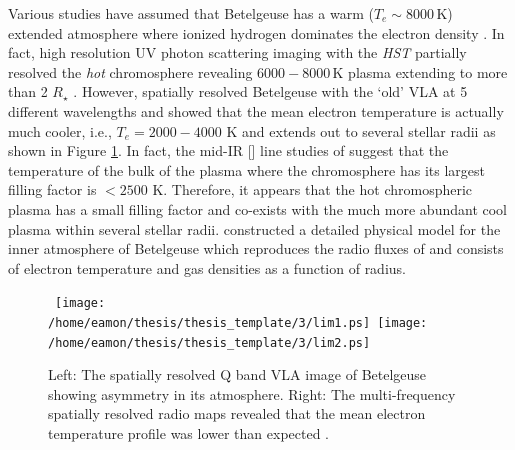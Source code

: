 Various studies have assumed that Betelgeuse has a warm ($T_e \sim 8000$\,K) extended atmosphere where ionized hydrogen dominates the electron density \citep[e.g.,][]{newell_1982,hartmann_1984}. In fact, high resolution UV photon scattering imaging with the \textit{HST} partially resolved the \textit{hot} chromosphere revealing $6000-8000$\,K plasma extending to more than 2 $R_{\star}$ \citep{gilliland_1996}. However, \cite{lim_1998} spatially resolved Betelgeuse with the `old' VLA at 5 different wavelengths and showed that the mean electron temperature is actually much cooler, i.e., $T_e = 2000 - 4000$ K and extends out to several stellar radii as shown in Figure \ref{fig3.1}. In fact, the mid-IR [] line studies of \cite{harper_2009} suggest that the temperature of the bulk of the plasma where the chromosphere has its largest filling factor is $< 2500$ K. Therefore, it appears that the hot chromospheric plasma has a small filling factor and co-exists with the much more abundant cool plasma within several stellar radii. \cite{harper_2001} constructed a detailed physical model for the inner atmosphere of Betelgeuse which reproduces the radio fluxes of \cite{lim_1998} and consists of electron temperature and gas densities as a function of radius.

\begin{figure}[hbt!]
\centering 
\mbox{
          \texttt{[image: /home/eamon/thesis/thesis\_template/3/lim1.ps]}
          \texttt{[image: /home/eamon/thesis/thesis\_template/3/lim2.ps]}
          }
\caption[VLA spatially resolved analysis of Betelgeuse]{Left: The spatially resolved Q band VLA image of Betelgeuse showing asymmetry in its atmosphere. Right: The multi-frequency spatially resolved radio maps revealed that the mean electron temperature profile was lower than expected \citep{lim_1998}.}
\label{fig3.1}
\end{figure}

